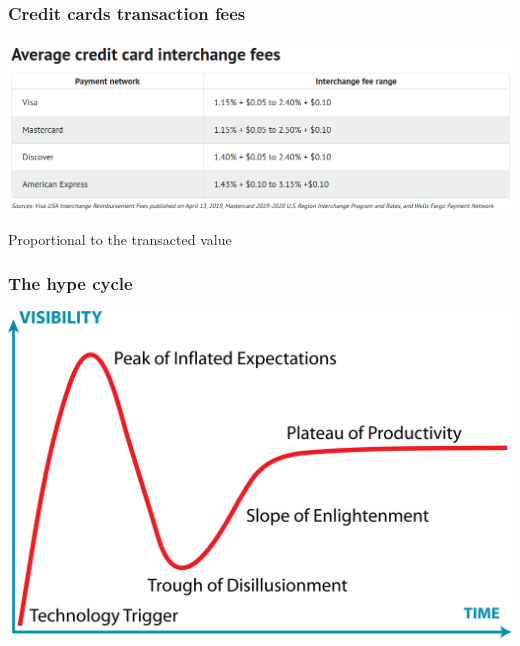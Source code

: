 \documentclass[11pt]{beamer}  %
\begin{document}
\begin{frame}\frametitle{Credit cards transaction fees}

  \begin{center}
    \includegraphics[width=\textwidth,clip=false]{pictures/credit-cards-fees.png}
  \end{center}

  \begin{center}
    Proportional to the transacted value
  \end{center}

\end{frame}

\begin{frame}\frametitle{The hype cycle}

  \begin{center}
    \includegraphics[width=\textwidth,clip=false]{pictures/hype-cycle.png}
  \end{center}

\end{frame}
\end{document}
